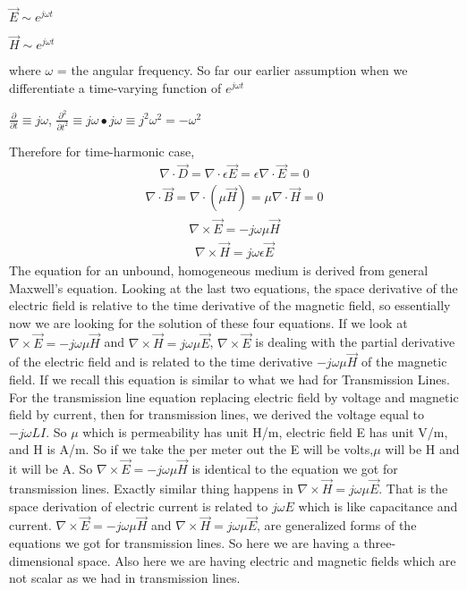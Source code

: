 $\vec{E} \sim e^{j\omega t}$

$\vec{H} \sim e^{j\omega t}$

where 
$\omega$ = the angular frequency.
So far our earlier assumption when we differentiate a time-varying function of $e^{j\omega t}$

$\frac{\partial}{\partial t} \equiv j\omega$, 
$\frac{\partial^2}{\partial t^2} \equiv j\omega \bullet j\omega \equiv j^2\omega^2=-\omega^2$

Therefore for time-harmonic case,
\begin{align}
\nabla\cdot\vec{D}=\nabla\cdot \epsilon \vec{E}=\epsilon \nabla\cdot\vec{E}=0
\end{align}
\begin{align}
\nabla\cdot\vec{B}=\nabla\cdot (\mu\vec{H})=\mu \nabla\cdot\vec{H}=0
\end{align}
\begin{align}
\nabla \times \vec{E}=-j\omega\mu\vec{H}
\end{align}
\begin{align}
\nabla\times\vec{H}=j\omega\epsilon\vec{E}
\end{align}
The equation for an unbound, homogeneous medium is derived from general Maxwell's equation. Looking at the last two equations, the space derivative of the electric field is relative to the time derivative of the magnetic field, so essentially now we are looking for the solution of these four equations. If we look at $\nabla\times\vec{E}=-j\omega\mu\vec{H}$ and $\nabla\times\vec{H}=j\omega\mu\vec{E}$, $\nabla\times\vec{E}$ is dealing with the partial derivative of the electric field and is related to the time derivative $-j\omega\mu\vec{H}$ of the magnetic field. If we recall this equation is similar to what we had for Transmission Lines. For the transmission line equation replacing electric field by voltage and magnetic field by current, then for transmission lines, we derived the voltage equal to $-j\omega LI$. So $\mu$ which is permeability has unit H/m, electric field E has unit V/m, and H is A/m. So if we take the per meter out the E will be volts,$\mu$ will be H and it will be A. So $\nabla\times\vec{E}=-j\omega\mu\vec{H}$ is identical to the equation we got for transmission lines. Exactly similar thing happens in $\nabla\times\vec{H}=j\omega\mu\vec{E}$. That is the space derivation of electric current is related to $j\omega E$ which is like capacitance and current. $\nabla\times\vec{E}=-j\omega\mu\vec{H}$ and $\nabla\times\vec{H}=j\omega\mu\vec{E}$, are generalized forms of the equations we got for transmission lines. So here we are having a three-dimensional space. Also here we are having electric and magnetic fields which are not scalar as we had in transmission lines.

